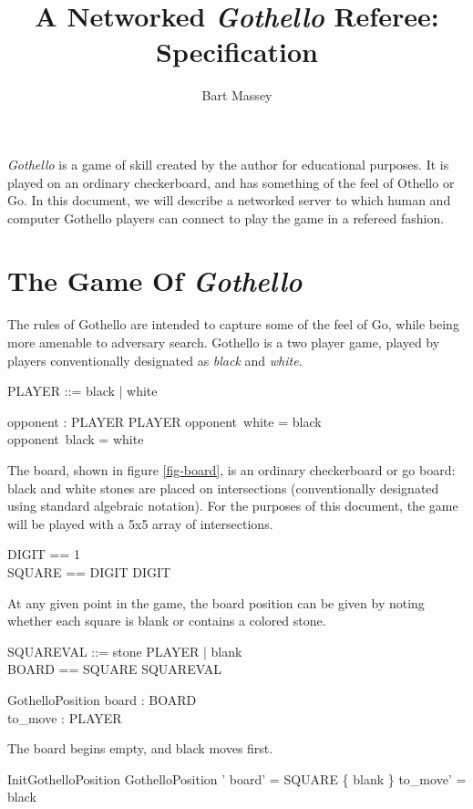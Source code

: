 \documentclass{article}
\title{A Networked {\em Gothello} Referee: Specification}
\author{Bart Massey}
\begin{document}
\maketitle

{\em Gothello} is a
game of skill created by the author for
educational purposes. It is played on an ordinary
checkerboard, and has something of the feel of Othello or
Go.  In this document, we will describe a networked server
to which human and computer Gothello players can connect to play
the game in a refereed fashion.

\section{The Game Of {\em Gothello}}

The rules of Gothello are intended to capture some of the
feel of Go, while being more amenable to adversary search.
Gothello is a two player game, played by players conventionally
designated as {\em black} and {\em white}.
\begin{zed}
PLAYER ::= black | white
\end{zed}
\begin{axdef}
  opponent : PLAYER \bij PLAYER
\where
  opponent~white = black \\
  opponent~black = white
\end{axdef}

The board,
shown in figure \ref{fig-board}, is an ordinary
checkerboard or go board: black and white stones are placed on
intersections
(conventionally designated using standard algebraic
notation).  For the purposes of this document, the game
will be played with a 5x5 array of intersections.
\begin{zed}
DIGIT == 1  \\
SQUARE == DIGIT \cross DIGIT
\end{zed}
At any given point in the game, the board position can
be given by noting whether each square is blank or
contains a colored stone.
\begin{zed}
SQUAREVAL ::= stone \ldata PLAYER \rdata | blank \\
BOARD == SQUARE \fun SQUAREVAL
\end{zed}
\begin{schema}{GothelloPosition}
  board : BOARD \\
  to\_move : PLAYER
\end{schema}
The board begins empty, and black moves first.
\begin{schema}{InitGothelloPosition}
  GothelloPosition '
\where
  board' = SQUARE \cross \{ blank \}
\also
  to\_move' = black
\end{schema}
\end{document}
